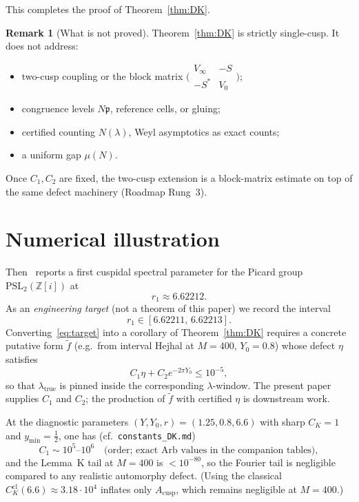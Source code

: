 \documentclass[11pt]{amsart}
\theoremstyle{definition}
\newtheorem{remark}[theorem]{Remark}
\newcommand{\ZZ}{\mathbb{Z}}
\newcommand{\PSL}{\mathrm{PSL}}
\begin{document}
This completes the proof of Theorem~\ref{thm:DK}.
\endproof

\begin{remark}[What is not proved]
\label{rem:notproved}
Theorem~\ref{thm:DK} is strictly single-cusp.  It does not address:
\begin{itemize}[leftmargin=*]
\item two-cusp coupling or the block matrix
$\bigl(\begin{smallmatrix}V_\infty&-S\\-S^*&V_0\end{smallmatrix}\bigr)$;
\item congruence levels $N\mathfrak{p}$, reference cells, or gluing;
\item certified counting $N(\lambda)$, Weyl asymptotics as exact counts;
\item a uniform gap $\mu(N)$.
\end{itemize}
Once $C_1,C_2$ are fixed, the two-cusp extension is a block-matrix
estimate on top of the same defect machinery (Roadmap Rung~3).
\end{remark}

\section{Numerical illustration}
\label{sec:numeric}

Then~\cite{Then} reports a first cuspidal spectral parameter for the
Picard group $\PSL_2(\ZZ[i])$ at
\[
  r_1 \approx 6.62212.
\]
As an \emph{engineering target} (not a theorem of this paper) we record
the interval
\begin{equation}
\label{eq:target}
  r_1\in[6.62211,\,6.62213].
\end{equation}
Converting~\eqref{eq:target} into a corollary of Theorem~\ref{thm:DK}
requires a concrete putative form $\widetilde f$ (e.g.\ from interval
Hejhal at $M=400$, $Y_0=0.8$) whose defect $\eta$ satisfies
\[
  C_1\eta+C_2 e^{-2\pi Y_0}
  \le
  10^{-5},
\]
so that $\lambda_{\mathrm{true}}$ is pinned inside the corresponding
$\lambda$-window.  The present paper supplies $C_1$ and $C_2$; the
production of $\widetilde f$ with certified $\eta$ is downstream work.

At the diagnostic parameters $(Y,Y_0,r)=(1.25,0.8,6.6)$ with sharp
$C_K=1$ and $y_{\min}=\tfrac12$, one has (cf.\ \texttt{constants\_DK.md})
\[
  C_1\sim 10^{5}\text{--}10^{6}
  \quad\text{(order; exact Arb values in the companion tables)},
\]
and the Lemma~K tail at $M=400$ is $<10^{-80}$, so the Fourier tail is
negligible compared to any realistic automorphy defect.  (Using the
classical $C_K^{\mathrm{cl}}(6.6)\approx 3.18\cdot 10^{4}$ inflates only
$A_{\mathrm{cusp}}$, which remains negligible at $M=400$.)
\end{document}
